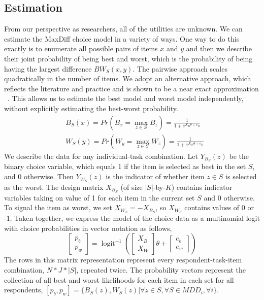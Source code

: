 \documentclass[nonblindrev]{informs3}
\DeclareMathOperator{\logit}{logit}
\begin{document}
\subsection{Estimation}
From our perspective as researchers, all of the utilities are unknown. We can estimate the MaxDiff choice model in a variety of ways. One way to do this exactly is to enumerate all possible pairs of items $x$ and $y$ and then we describe their joint probability of being best and worst, which is the probability of being having the largest difference $BW_S(x,y)$. The pairwise approach scales quadratically in the number of items. We adopt an alternative approach, which reflects the literature and practice and is shown to be a near exact approximation ~\cite{cohen2003maximum}. This allows us to estimate the best model and worst model independently, without explicitly estimating the best-worst probability. 
\begin{align*}
&B_S(x)=Pr(B_x=\max_{z \in S}B_z)=\frac{1}{1+e^{X_B \theta+ e_B}}\\
&W_S(y)=Pr(W_y=\max_{z \in S}W_z)=\frac{1}{1+e^{X_W \theta+ e_B}}
\end{align*}
We describe the data for any individual-task combination. Let $Y_{B_S}(z)$ be the binary choice variable, which equals 1 if the item is selected as best in the set $S$, and 0 otherwise. Then $Y_{W_S}(z)$ is the indicator of whether item $z \in S$ is selected as the worst. The design matrix $X_{B_S}$ (of size $|S|$-by-$K$) contains indicator variables taking on value of 1 for each item in the current set $S$ and 0 otherwise. To signal the item as worst, we set $X_{W_S}=-X_{B_S}$, so $X_{W_S}$ contains values of 0 or -1. Taken together, we express the model of the choice data as a multinomial logit with choice probabilities in vector notation as follows,
\[
\begin{bmatrix}
p_b\\
p_w
\end{bmatrix}
=\logit^{-1}(\begin{bmatrix}X_B\\X_W\end{bmatrix}\theta+\begin{bmatrix}e_b\\e_w \end{bmatrix})
\]
The rows in this matrix representation represent every respondent-task-item combination, $N*J*|S|$, repeated twice.  The probability vectors represent the collection of all best and worst likelihoods for each item in each set for all respondents, $[p_b,p_w]=\{B_S(z),W_S(z)|\forall z \in S, \forall S \in MDD_i, \forall i\}$.
\end{document}
